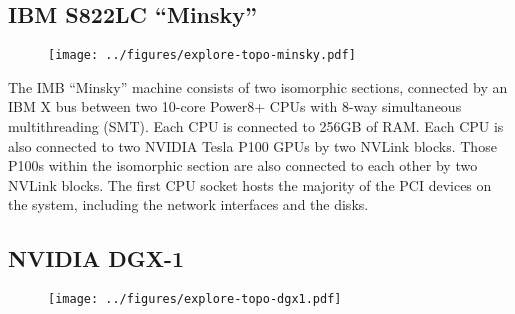 \subsection{IBM S822LC ``Minsky''}
\label{sec:topology-minsky}
\begin{figure}[h]
    \centering
    \texttt{[image: ../figures/explore-topo-minsky.pdf]}
    \caption[]{}
    \label{fig:actual-perf}
\end{figure}

The IMB ``Minsky'' machine consists of two isomorphic sections, connected by an IBM X bus between two 10-core Power8+ CPUs with 8-way simultaneous multithreading (SMT).
Each CPU is connected to 256GB of  RAM.
Each CPU is also connected to two NVIDIA Tesla P100 GPUs by two NVLink blocks.
Those P100s within the isomorphic section are also connected to each other by two NVLink blocks.
The first CPU socket hosts the majority of the PCI devices on the system, including the network interfaces and the disks.

\subsection{NVIDIA DGX-1}
\label{sec:topology-dgx1}

\begin{figure}[h]
    \centering
    \texttt{[image: ../figures/explore-topo-dgx1.pdf]}
    \caption[]{}
    \label{fig:actual-perf}
\end{figure}
